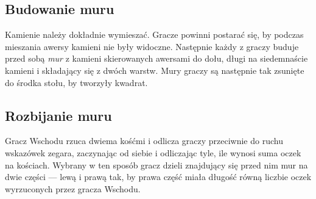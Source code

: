 \subsection{Budowanie muru}
Kamienie należy dokładnie wymieszać.
Gracze powinni postarać się, by podczas mieszania awersy kamieni nie były
widoczne.
Następnie każdy z graczy buduje przed sobą \emph{mur} z kamieni skierowanych
awersami do dołu, długi na siedemnaście kamieni i składający się z dwóch warstw.
Mury graczy są następnie tak zsunięte do środka stołu, by tworzyły kwadrat.

\subsection{Rozbijanie muru}
Gracz Wschodu rzuca dwiema kośćmi i odlicza graczy przeciwnie do ruchu wskazówek
zegara, zaczynając od siebie i odliczając tyle, ile wynosi suma oczek na
kościach.
Wybrany w ten sposób gracz dzieli znajdujący się przed nim mur na dwie części
--- lewą i prawą tak, by prawa część miała długość równą liczbie oczek
wyrzuconych przez gracza Wschodu.
